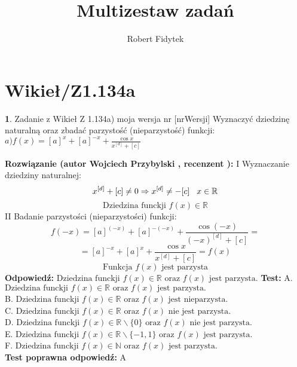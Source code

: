 \documentclass[12pt, a4paper]{article}
\title{Multizestaw zadań}
\author{Robert Fidytek}
\date{}
\theoremstyle{definition} %
\newtheorem{zad}{}
\newcommand{\kategoria}[1]{\section{#1}} %
\newcommand{\zadStart}[1]{\begin{zad}#1\newline} %
\newcommand{\zadStop}{\end{zad}}   %
\newcommand{\rozwStart}[2]{\noindent \textbf{Rozwiązanie (autor #1 , recenzent #2): }\newline} %
\newcommand{\rozwStop}{\newline}                                            %
\newcommand{\odpStart}{\noindent \textbf{Odpowiedź:}\newline}    %
\newcommand{\odpStop}{\newline}                                             %
\newcommand{\testStart}{\noindent \textbf{Test:}\newline} %
\newcommand{\testStop}{\newline} %
\newcommand{\kluczStart}{\noindent \textbf{Test poprawna odpowiedź:}\newline} %
\newcommand{\kluczStop}{\newline} %
\begin{document}
\maketitle


\kategoria{Wikieł/Z1.134a}
\zadStart{Zadanie z Wikieł Z 1.134a) moja wersja nr [nrWersji]}
Wyznaczyć dziedzinę naturalną oraz zbadać parzystość (nieparzystość) funkcji:\\
$a)f(x)=[a]^{x}+[a]^{-x}+\frac{\cos x}{x^{[d]}+[c]}$
\zadStop
\rozwStart{Wojciech Przybylski}{}
I Wyznaczanie dziedziny naturalnej:\\
$$x^{[d]}+[c]\neq0 \Rightarrow x^{[d]}\neq-[c]\hspace{3mm}x\in\mathbb{R} $$
$$\mbox{Dziedzina funckji }f(x)\in \mathbb{R}$$
II Badanie parzystości (nieparzystości) funkcji:
$$f(-x)=[a]^{(-x)}+[a]^{-(-x)}+\frac{\cos (-x)}{(-x)^{[d]}+[c]}=$$
$$=[a]^{-x}+[a]^{x}+\frac{\cos x}{x^{[d]}+[c]}=f(x)$$
$$\mbox{Funkcja }f(x)\mbox{ jest parzysta}$$
\rozwStop
\odpStart
$\mbox{Dziedzina funckji }f(x)\in \mathbb{R} \mbox{ oraz } f(x)\mbox{ jest parzysta.}$ 
\odpStop
\testStart
A. $\mbox{Dziedzina funckji }f(x)\in \mathbb{R} \mbox{ oraz } f(x)\mbox{ jest parzysta.}$ \\
B. $\mbox{Dziedzina funckji }f(x)\in \mathbb{R} \mbox{ oraz } f(x)\mbox{ jest nieparzysta.}$ \\
C. $\mbox{Dziedzina funckji }f(x)\in \mathbb{R} \mbox{ oraz } f(x)\mbox{ nie jest parzysta.}$ \\
D. $\mbox{Dziedzina funckji }f(x)\in \mathbb{R}\backslash\{0\} \mbox{ oraz } f(x)\mbox{ nie jest parzysta.}$ \\
E. $\mbox{Dziedzina funckji }f(x)\in \mathbb{R}{\backslash}\{-1,1\} \mbox{ oraz } f(x)\mbox{ jest parzysta.}$ \\
F. $\mbox{Dziedzina funckji }f(x)\in \mathbb{N} \mbox{ oraz } f(x)\mbox{ jest parzysta.}$ \\
\testStop
\kluczStart
A
\kluczStop
\end{document}
